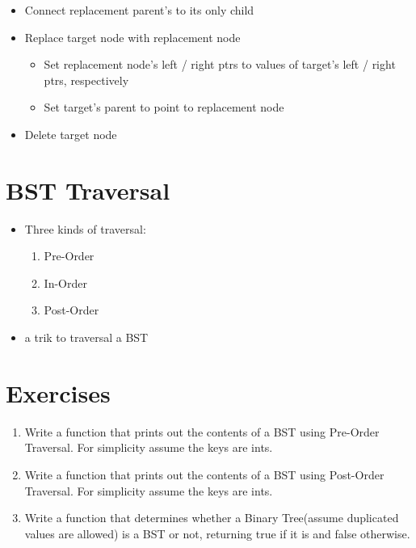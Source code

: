 \documentclass[12pt]{article}
\begin{document}
\begin{itemize}
\begin{enumerate}
\begin{itemize}
            \item Connect replacement parent's to its only child
            \item Replace target node with replacement node
            \begin{itemize}
                \item Set replacement node's left / right ptrs to values of target's left / right ptrs, respectively
                \item Set target's parent to point to replacement node
            \end{itemize}
            \item Delete target node
        \end{itemize}
    \end{enumerate}
\end{itemize}

\section{BST Traversal}
\begin{itemize}
    \item Three kinds of traversal:
    \begin{enumerate}
        \item Pre-Order
        \item In-Order
        \item Post-Order
    \end{enumerate}
    \item a trik to traversal a BST
\end{itemize}

\section{Exercises}
\begin{enumerate}
    \item Write a function that prints out the contents of a BST using Pre-Order Traversal. 
    For simplicity assume the keys are ints.
    \item Write a function that prints out the contents of a BST using Post-Order Traversal. 
    For simplicity assume the keys are ints.
    \item Write a function that determines whether a Binary Tree(assume duplicated values are allowed)
     is a BST or not, returning true if it is and false otherwise.
\end{enumerate}
\end{document}
